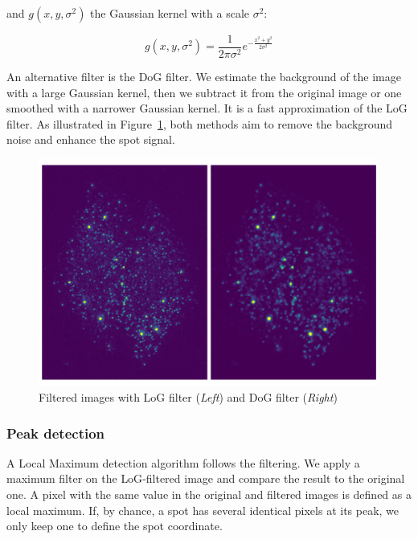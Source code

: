 \noindent
and $g(x, y, \sigma^2)$ the Gaussian kernel with a scale $\sigma^2$:

\begin{equation}
	{\displaystyle g(x, y, \sigma^2) = \frac{1}{2\pi \sigma^2} e^{-{\frac{x^{2} + y^{2}}{2\sigma^2}}}}
\end{equation}

An alternative filter is the \ac{DoG} filter.
We estimate the background of the image with a large Gaussian kernel, then we subtract it from the original image or one smoothed with a narrower Gaussian kernel.
It is a fast approximation of the \ac{LoG} filter.
As illustrated in Figure~\ref{fig:filters_detection}, both methods aim to remove the background noise and enhance the spot signal.


\begin{figure}[h]
    \centering
    \includegraphics[width=1\textwidth]{figures/chapter2/filter_background}
    \caption{Filtered images with LoG filter (\textit{Left}) and DoG filter (\textit{Right})}
    \label{fig:filters_detection}
\end{figure}

\subsubsection{Peak detection}

A Local Maximum detection algorithm follows the filtering.
We apply a maximum filter on the \ac{LoG}-filtered image and compare the result to the original one.
A pixel with the same value in the original and filtered images is defined as a local maximum.
If, by chance, a spot has several identical pixels at its peak, we only keep one to define the spot coordinate.

